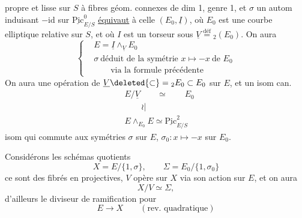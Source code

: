 propre et lisse sur $S$ à fibres géom. connexes de dim 1, genre 1, et $\sigma$ un autom induisant $-\mathrm{id}$ sur $\underline{\mathrm{Pic}}^0_{E/S}$ \uline{équivaut} à celle   $(E_0,\underline I)$, où $E_0$ est une courbe elliptique relative sur $S$, et où $I$ est un torseur sous  $\underline V\overset{\mathrm{déf}}{=}{}_2(E_0)$. On aura
\[
 \left\{\begin{aligned}
 &E=\underline I\mathbin{\wedge}_{\underline V}E_0\\
 &\sigma\ \text{déduit de la symétrie }x\mapsto-x\ \text{de }E_0\\
 &\hspace{2em}\text{via la formule précédente}
 \end{aligned}\right. \tag*{(21)}
\]
On aura une opération de $\underline V\deleted{\subset}={}_2E_0\subset E_0$ sur $E$, et un isom can.
\[
 \begin{aligned}
 &E/\underline V\qquad\simeq\qquad E_0\\
 &\qquad\wr\!|\\
 &E\mathbin{\wedge}_{E_0}E\simeq\underline{\mathrm{Pic}}^2_{E/S}
 \end{aligned} \tag*{(22)}
\]
isom qui commute aux symétries $\sigma$ sur $E$, $\sigma_0:x\mapsto-x$ sur $E_0$.

Considérons les schémas quotients
\[
 X=E/\{1,\sigma\},\qquad\Sigma=E_0/\{1,\sigma_0\} \tag*{(23)}
\]
ce sont des fibrés en   projectives,  $V$ opère  sur $X$  via son  action sur $E$, et on aura
\[
 X/V\simeq\Sigma, \tag*{(24)}
\]
d'ailleurs le diviseur de ramification pour
\[
 E\longrightarrow X\qquad(\text{rev. quadratique}) \tag*{(25)}
\]
